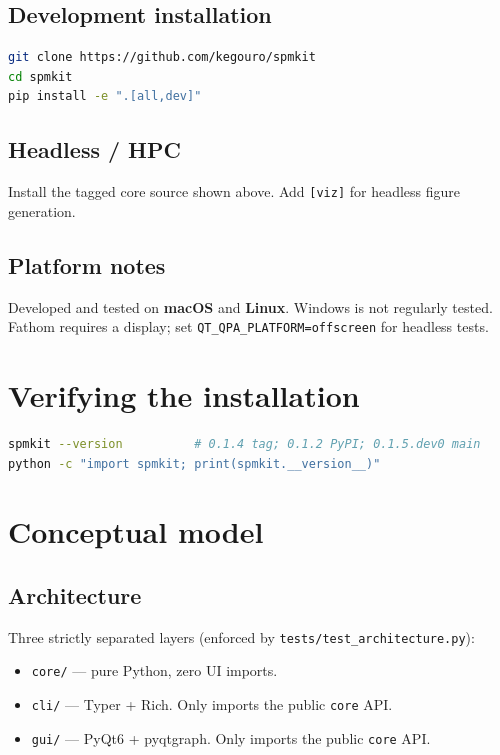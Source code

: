 \documentclass[a4paper,11pt]{article}
\begin{document}
\subsection{Development installation}
\begin{lstlisting}[language=bash]
git clone https://github.com/kegouro/spmkit
cd spmkit
pip install -e ".[all,dev]"
\end{lstlisting}

\subsection{Headless / HPC}
Install the tagged core source shown above. Add \texttt{[viz]} for headless figure
generation.

\subsection{Platform notes}
Developed and tested on \textbf{macOS} and \textbf{Linux}. Windows is not regularly tested.
Fathom requires a display; set \texttt{QT\_QPA\_PLATFORM=offscreen} for headless tests.

\section{Verifying the installation}

\begin{lstlisting}[language=bash]
spmkit --version          # 0.1.4 tag; 0.1.2 PyPI; 0.1.5.dev0 main
python -c "import spmkit; print(spmkit.__version__)"
\end{lstlisting}

\section{Conceptual model}

\subsection{Architecture}

Three strictly separated layers (enforced by \texttt{tests/test\_architecture.py}):

\begin{itemize}[nosep]
  \item \texttt{core/} --- pure Python, zero UI imports.
  \item \texttt{cli/} --- Typer + Rich. Only imports the public \texttt{core} API.
  \item \texttt{gui/} --- PyQt6 + pyqtgraph. Only imports the public \texttt{core} API.
\end{itemize}
\end{document}

